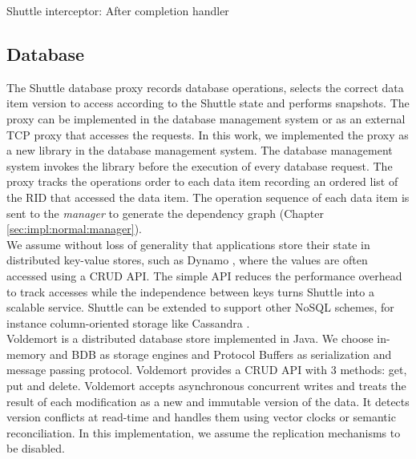 \begin{algorithm}
\DontPrintSemicolon{}

	\BlankLine
	 \caption{Shuttle interceptor: After completion handler}
	\label{code:interceptor_code_pos}
\end{algorithm}



\subsection{Database}\label{sec:impl:normal:database}
The Shuttle database proxy records database operations, selects the correct data item version to access according to the Shuttle state and performs snapshots. The proxy can be implemented in the database management system or as an external \ac{TCP} proxy that accesses the requests. In this work, we implemented the proxy as a new library in the database management system. The database management system invokes the library before the execution of every database request. The proxy tracks the operations order to each data item recording an ordered list of the \ac{RID} that accessed the data item. The operation sequence of each data item is sent to the \textit{manager} to generate the dependency graph (Chapter \ref{sec:impl:normal:manager}). \\


We assume without loss of generality that applications store their state in distributed key-value stores, such as Dynamo \cite{Decandia2007}, where the values are often accessed using a \acf{CRUD} API. The simple \ac{API} reduces the performance overhead to track accesses while the independence between keys turns Shuttle into a scalable service. Shuttle can be extended to support other \acs{NoSQL} schemes, for instance column-oriented storage like Cassandra \cite{Lakshman2010a}.\\

Voldemort is a distributed database store implemented in Java. We choose in-memory and \acf{BDB} as storage engines and Protocol Buffers as serialization and message passing protocol. Voldemort provides a \acf{CRUD} \ac{API} with 3 methods: get, put and delete. Voldemort accepts asynchronous concurrent writes and treats the result of each modification as a new and immutable version of the data. It detects version conflicts at read-time and handles them using vector clocks or semantic reconciliation. In this implementation, we assume the replication mechanisms to be disabled. 

